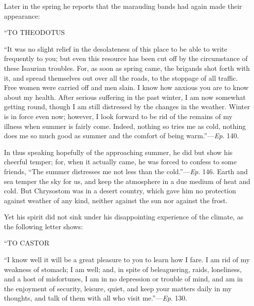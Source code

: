 Later in the spring he reports that the marauding bands had again
made their appearance:

``TO
THEODOTUS

``It was no slight relief in the desolateness of this place to
be able to write frequently to you; but even this resource has been
cut off by the circumstance of these Isaurian troubles. For, as soon
as spring came, the brigands shot forth with it, and spread themselves
out over all the roads, to the stoppage of all traffic. Free women
were carried off and men slain. I know how anxious you are to know
about my health. After serious suffering in the past winter, I am now
somewhat getting round, though I am still distressed by the changes in
the weather. Winter is in force even now; however, I look forward to
be rid of the remains of my illness when summer is fairly come.
Indeed, nothing so tries me as cold, nothing
does me so much good as summer and the comfort of being warm.''—\emph{Ep}.
140.

In thus speaking hopefully of the approaching summer, he did but
show his cheerful temper; for, when it actually came, he was forced to
confess to some friends, ``The summer distresses me not less than
the cold.''—\emph{Ep}. 146. Earth and sea temper the sky for us,
and keep the atmosphere in a due medium of heat and cold. But
Chrysostom was in a desert country, which gave him no protection
against weather of any kind, neither against the sun nor against the
frost.

Yet his spirit did not sink under his disappointing experience of
the climate, as the following letter shows:

``TO
CASTOR

``I know well it will be a great pleasure to you to learn how I
fare. I am rid of my weakness of stomach; I am well; and, in spite of
beleaguering, raids, loneliness, and a host of misfortunes, I am in no
depression or trouble of mind, and am in the enjoyment of security,
leisure, quiet, and keep your matters daily in my thoughts, and talk
of them with all who visit me.''—\emph{Ep}. 130.

